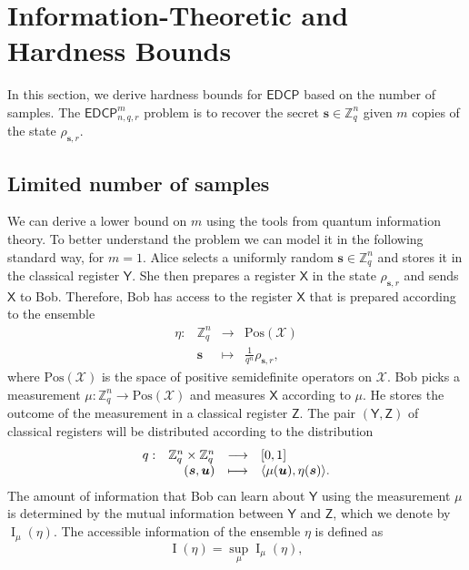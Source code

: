 \documentclass[11pt]{article}
\theoremstyle{plain}
\theoremstyle{definition}
\DeclarePairedDelimiter{\lrang}{\langle}{\rangle}
\def\Z{\mathbb{Z}}
\def\edcp{\mathsf{EDCP}}
\def\X{\mathcal{X}}
\begin{document}
\section{Information-Theoretic and Hardness Bounds}
\label{sec:hardness}

In this section, we derive hardness bounds for $\edcp$ based on the number of samples. The $\edcp_{n, q, r}^m$ problem is to recover the secret $\bm{s} \in \Z_q^n$ given $m$ copies of the state $\rho_{\bm{s}, r}$.



\subsection{Limited number of samples}

We can derive a lower bound on $m$ using the tools from quantum information theory. To better understand the problem we can model it in the following standard way, for $m = 1$. Alice selects a uniformly random $\bm{s} \in \Z_q^n$ and stores it in the classical register $\mathsf{Y}$. She then prepares a register $\mathsf{X}$ in the state $\rho_{\bm{s}, r}$ and sends $\mathsf{X}$ to Bob. Therefore, Bob has access to the register $\mathsf{X}$ that is prepared according to the ensemble
\[
\begin{array}{rrll}
    \eta: & \Z_q^n & \longrightarrow & \mathrm{Pos}(\X) \\
    & \bm{s} & \longmapsto & \frac{1}{q^n}\rho_{\bm{s}, r},
\end{array}
\]
where $\mathrm{Pos(\X)}$ is the space of positive semidefinite operators on $\X$. Bob picks a measurement $\mu: \Z_q^n \rightarrow \mathrm{Pos}(\X)$ and measures $\mathsf{X}$ according to $\mu$. He stores the outcome of the measurement in a classical register $\mathsf{Z}$. The pair $(\mathsf{Y}, \mathsf{Z})$ of classical registers will be distributed according to the distribution
\[
\begin{array}{rrll}
    q: & \Z_q^n \times \Z_q^n & \longrightarrow & [0, 1] \\
    & (\bm{s}, \bm{u}) & \longmapsto & \lrang{\mu(\bm{u}), \eta(\bm{s})}.
\end{array}
\]
The amount of information that Bob can learn about $\mathsf{Y}$ using the measurement $\mu$ is determined by the mutual information between $\mathsf{Y}$ and $\mathsf{Z}$, which we denote by $\operatorname{I}_\mu(\eta)$. The accessible information of the ensemble $\eta$ is defined as
\[ \operatorname{I}(\eta) = \sup_{\mu} \operatorname{I}_\mu(\eta), \]
\end{document}
